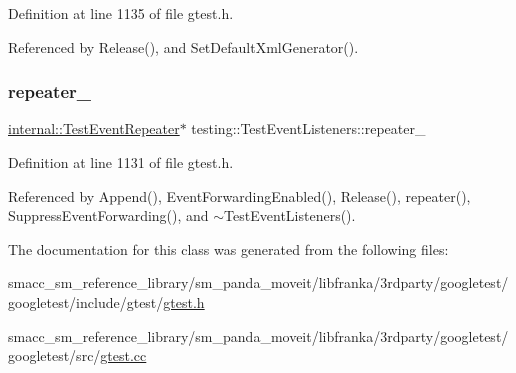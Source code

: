 Definition at line 1135 of file gtest.\+h.



Referenced by Release(), and Set\+Default\+Xml\+Generator().

\mbox{\label{classtesting_1_1TestEventListeners_a625d58b951893e80cde12862aece6fd8}} 
\subsubsection{\texorpdfstring{repeater\+\_\+}{repeater\_}}
{\footnotesize\ttfamily \hyperlink{classtesting_1_1internal_1_1TestEventRepeater}{internal\+::\+Test\+Event\+Repeater}$\ast$ testing\+::\+Test\+Event\+Listeners\+::repeater\+\_\+\hspace{0.3cm}{\ttfamily [private]}}



Definition at line 1131 of file gtest.\+h.



Referenced by Append(), Event\+Forwarding\+Enabled(), Release(), repeater(), Suppress\+Event\+Forwarding(), and $\sim$\+Test\+Event\+Listeners().



The documentation for this class was generated from the following files\+:\begin{DoxyCompactItemize}
\item 
smacc\+\_\+sm\+\_\+reference\+\_\+library/sm\+\_\+panda\+\_\+moveit/libfranka/3rdparty/googletest/googletest/include/gtest/\hyperlink{gtest_8h}{gtest.\+h}\item 
smacc\+\_\+sm\+\_\+reference\+\_\+library/sm\+\_\+panda\+\_\+moveit/libfranka/3rdparty/googletest/googletest/src/\hyperlink{gtest_8cc}{gtest.\+cc}\end{DoxyCompactItemize}
